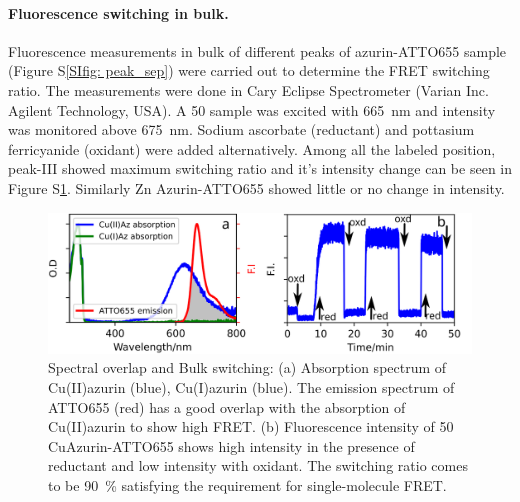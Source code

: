 \paragraph*{Fluorescence switching in bulk.} Fluorescence measurements in bulk of different peaks of azurin-ATTO655 sample (Figure S\ref{SIfig: peak_sep}) were carried out to determine the FRET switching ratio.
The measurements were done in Cary Eclipse Spectrometer (Varian Inc. Agilent Technology, USA).
A \SI{50}{\nM} sample was excited with \SI{665}{\nm} and intensity was monitored above \SI{675}{\nm}.
Sodium ascorbate (reductant) and pottasium ferricyanide (oxidant) were added alternatively.
Among all the labeled position, peak-III showed maximum switching ratio and it's intensity change can be seen in Figure S\ref{SIfig: switching}.
Similarly Zn Azurin-ATTO655 showed little or no change in intensity.
\begin{figure}
  \centering
  \includegraphics[width=\textwidth]{spectral_overlap_switching}
  \makeatletter
  \renewcommand{\fnum@figure}{\figurename~S\thefigure}
  \makeatother
  \caption{Spectral overlap and Bulk switching: (a) Absorption spectrum of Cu(II)azurin (blue), Cu(I)azurin (blue).
  The emission spectrum of ATTO655 (red) has a good overlap with the absorption of Cu(II)azurin to show high FRET. 
  (b) Fluorescence intensity of \SI{50}{\nM} CuAzurin-ATTO655 shows high intensity in the presence of reductant and low 
  intensity with oxidant.
  The switching ratio comes to be \SI{90}{\percent} satisfying the requirement for single-molecule FRET.}
  \label{SIfig: switching}
\end{figure}

